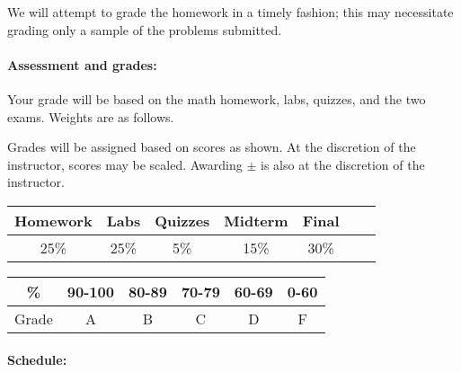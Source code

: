 \documentclass{article}
\begin{document}
We will attempt to grade the homework in a timely
fashion; this may necessitate grading only a sample of the problems
submitted.

\paragraph{Assessment and grades:}

Your grade will be based on the math homework, labs, quizzes, and the two
exams. Weights are as follows.

Grades will be assigned based on scores as shown.  At the discretion
of the instructor, scores may be scaled.  Awarding $\pm$ is also at
the discretion of the instructor.

\begin{tabular}{|c|c|c|c|c|c|c|}\hline
Homework & Labs & Quizzes & Midterm & Final\\\hline
25\% & 25\% & 5\% & 15\% & 30\% \\\hline
\end{tabular}\hfill
\begin{tabular}{|c|c|c|c|c|c|}\hline
\% & 90-100 & 80-89 & 70-79 & 60-69 & 0-60\\\hline
Grade & A & B & C & D & F\\\hline
\end{tabular}


  
\paragraph{Schedule:}
\end{document}
